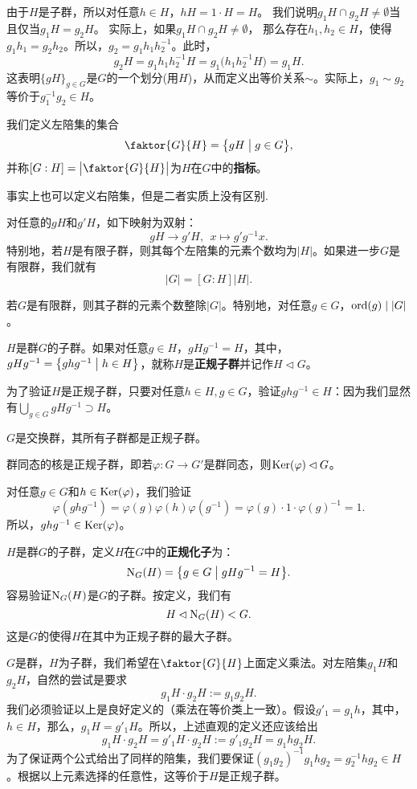 \documentclass[lang=cn,10pt]{elegantbook}
\begin{document}
	由于$H$是子群，所以对任意$h\in H$，$hH=1\cdot H=H$。
	我们说明$g_1H\cap g_2H\neq \emptyset$当且仅当$g_1H= g_2H$。
	实际上，如果$g_1H\cap g_2H\neq \emptyset$，
	那么存在$h_1, h_2\in H$，使得$g_1h_1=g_2h_2$。所以，$g_2=g_1h_1h_2^{-1}$。此时，
	\[g_2H=g_1h_1h_2^{-1}H=g_1\big(h_1h_2^{-1}H\big)=g_1H.\]
	这表明$\{gH\}_{g\in G}$是$G$的一个划分(用\(H\))，从而定义出等价关系$\sim$。实际上，$g_1\sim g_2$等价于$g_1^{-1}g_2\in H$。
	\begin{definition}[商集和指标]
		我们定义左陪集的集合
		\[\faktor{G}{H}=\big\{gH\bigm| g\in G\big\},\]
		并称$[G:H]=\big|\faktor{G}{H}\big|$为$H$在$G$中的{\bf 指标}。
	\end{definition}
	事实上也可以定义右陪集，但是二者实质上没有区别.
	\begin{proposition}[左陪集的元素个数]
			对任意的$gH$和$g'H$，如下映射为双射：
			\[gH \rightarrow g'H, \ \ x \mapsto g'g^{-1}x.\]
			特别地，若$H$是有限子群，则其每个左陪集的元素个数均为$|H|$。如果进一步$G$是有限群，我们就有
			\[|G|=[G:H]|H|.\]
	\end{proposition}
	\begin{theorem}[Lagrange]
		若$G$是有限群，则其子群的元素个数整除$|G|$。特别地，对任意$g\in G$，${\rm ord}(g)\mid |G|$。
	\end{theorem}
	\begin{definition}[正规子群]
			$H$是群$G$的子群。如果对任意$g\in H$，$g H g^{-1}=H$，其中，$gHg^{-1}=\big\{ghg^{-1}\bigm| h\in H\big\}$，就称$H$是{\bf 正规子群}并记作$H \lhd G$。
	\end{definition}
	\begin{note}
		为了验证$H$是正规子群，只要对任意$h\in H,g\in G$，验证$ghg^{-1}\in H$：因为我们显然有$\bigcup_{g\in G}gHg^{-1}\supset H$。
	\end{note}
	\begin{example}
		$G$是交换群，其所有子群都是正规子群。
	\end{example}
	\begin{example}
		群同态的核是正规子群，即若$\varphi\colon G\rightarrow G'$是群同态，则${\rm Ker}(\varphi)\lhd G$。
		
		对任意$g\in G$和$h\in {\rm Ker}(\varphi)$，我们验证
		\[\varphi(ghg^{-1})=\varphi(g )\varphi(h)\varphi( g^{-1})=\varphi(g )\cdot 1 \cdot\varphi( g)^{-1}=1.\]
		所以，$ghg^{-1}\in {\rm Ker}(\varphi)$。
	\end{example}
	\begin{definition}[正规化子]
			$H$是群$G$的子群，定义$H$在$G$中的{\bf 正规化子}为：
			\[{\rm N}_G(H)=\big\{g\in G\bigm| gHg^{-1}=H\big\}.\]
			容易验证${\rm N}_G(H)$是$G$的子群。按定义，我们有
			\[H\lhd {\rm N}_G(H) <G.\]
			这是$G$的使得$H$在其中为正规子群的最大子群。
	\end{definition}
	$G$是群，$H$为子群，我们希望在$\faktor{G}{H}$上面定义乘法。对左陪集$g_1H$和$g_2H$，自然的尝试是要求
	\[g_1H \cdot g_2H := g_1g_2 H.\]
	我们必须验证以上是良好定义的（乘法在等价类上一致）。假设$g'_1=g_1h$，其中，$h\in H$，那么，$g_1H=g'_1H$。所以，上述直观的定义还应该给出
	\[g_1H \cdot g_2H=g'_1H \cdot g_2H := g'_1g_2 H=g_1hg_2 H.\]
	为了保证两个公式给出了同样的陪集，我们要保证$(g_1g_2)^{-1}g_1hg_2= g_2^{-1} hg_2\in H$。根据以上元素选择的任意性，这等价于$H$是正规子群。
	
\end{document}
